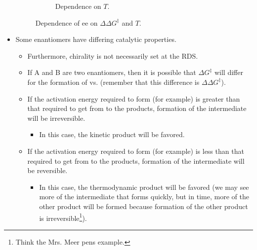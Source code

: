 \documentclass[../notes.tex]{subfiles}
\begin{document}
\begin{itemize}
\begin{figure}[h!]
\begin{subfigure}[b]{0.49\linewidth}
            \caption{Dependence on $T$.}
            \label{fig:ee-DeltaDelta-Tb}
        \end{subfigure}
        \caption{Dependence of ee on $\Delta\Delta G^\ddagger$ and $T$.}
        \label{fig:ee-DeltaDelta-T}
    \end{figure}
    \item Some enantiomers have differing catalytic properties.
    \begin{itemize}
        \item Furthermore, chirality is not necessarily set at the RDS.
        \item If A and B are two enantiomers, then it is possible that $\Delta G^\ddagger$ will differ for the formation of  vs.  (remember that this difference is $\Delta\Delta G^\ddagger$).
        \item If the activation energy required to form  (for example) is greater than that required to get from  to the products, formation of the  intermediate will be irreversible.
        \begin{itemize}
            \item In this case, the kinetic product will be favored.
        \end{itemize}
        \item If the activation energy required to form  (for example) is less than that required to get from  to the products, formation of the  intermediate will be reversible.
        \begin{itemize}
            \item In this case, the thermodynamic product will be favored (we may see more of the intermediate that forms quickly, but in time, more of the other product will be formed because formation of the other product is irreversible\footnote{Think the Mrs. Meer pens example.}).
        \end{itemize}
    \end{itemize}
\end{itemize}
\end{document}
